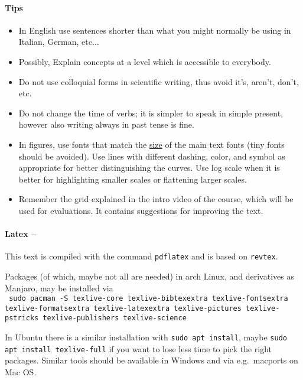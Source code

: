 \documentclass[prl,twocolumn]{revtex4-1}
\begin{document}
\paragraph{\bf Tips}
\begin{itemize}
\item In English use sentences shorter than what you might normally be using in Italian, German, etc...
\item Possibly, Explain concepts at a level which is accessible to everybody.
\item Do not use colloquial forms in scientific writing, thus avoid it's, aren't, don't, etc.
\item Do not change the time of verbs; it is simpler to speak in simple present, however also writing always in past tense is fine.
\item In figures, use fonts that match the \underline{size} of the main text fonts (tiny fonts should be avoided). Use lines with different dashing, color, and symbol as appropriate for better distinguishing the curves. Use log scale when it is better for highlighting smaller scales or flattening larger scales. 
\item Remember the grid explained in the intro video of the course, which will be used for evaluations. It contains suggestions for improving the text.
\end{itemize}




\paragraph{\bf Latex --}

This text is compiled with the command \texttt{pdflatex} and is based on \texttt{revtex}.

Packages (of which, maybe not all are needed) in arch Linux, and derivatives as Manjaro, may be installed via\\
\texttt{
  sudo pacman -S texlive-core texlive-bibtexextra texlive-fontsextra  texlive-formatsextra texlive-latexextra texlive-pictures texlive-pstricks texlive-publishers  texlive-science}

\vspace{0.2cm}
In Ubuntu there is a similar installation with \texttt{sudo apt install}, maybe \texttt{sudo apt install texlive-full} if you want to lose less time to pick the right packages. Similar tools should be available in Windows and via e.g.~macports on Mac OS.
\end{document}

